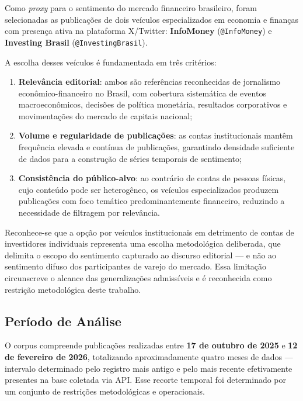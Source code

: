 Como \textit{proxy} para o sentimento do mercado financeiro brasileiro, foram selecionadas as publicações de dois veículos especializados em economia e finanças com presença ativa na plataforma X/Twitter: \textbf{InfoMoney} (\texttt{@InfoMoney}) e \textbf{Investing Brasil} (\texttt{@InvestingBrasil}).

A escolha desses veículos é fundamentada em três critérios:

\begin{enumerate}
	\item \textbf{Relevância editorial}: ambos são referências reconhecidas de jornalismo econômico-financeiro no Brasil, com cobertura sistemática de eventos macroeconômicos, decisões de política monetária, resultados corporativos e movimentações do mercado de capitais nacional;

	\item \textbf{Volume e regularidade de publicações}: as contas institucionais mantêm frequência elevada e contínua de publicações, garantindo densidade suficiente de dados para a construção de séries temporais de sentimento;

	\item \textbf{Consistência do público-alvo}: ao contrário de contas de pessoas físicas, cujo conteúdo pode ser heterogêneo, os veículos especializados produzem publicações com foco temático predominantemente financeiro, reduzindo a necessidade de filtragem por relevância.
\end{enumerate}

Reconhece-se que a opção por veículos institucionais em detrimento de contas de investidores individuais representa uma escolha metodológica deliberada, que delimita o escopo do sentimento capturado ao discurso editorial — e não ao sentimento difuso dos participantes de varejo do mercado. Essa limitação circunscreve o alcance das generalizações admissíveis e é reconhecida como restrição metodológica deste trabalho.

\subsection{Período de Análise}
\label{subsec:periodo}

O corpus compreende publicações realizadas entre \textbf{17 de outubro de 2025} e \textbf{12 de fevereiro de 2026}, totalizando aproximadamente quatro meses de dados — intervalo determinado pelo registro mais antigo e pelo mais recente efetivamente presentes na base coletada via API. Esse recorte temporal foi determinado por um conjunto de restrições metodológicas e operacionais.

